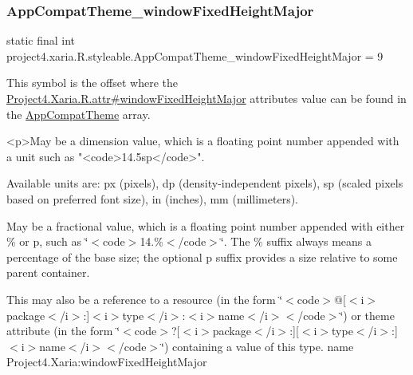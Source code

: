 \subsubsection{\texorpdfstring{App\+Compat\+Theme\+\_\+window\+Fixed\+Height\+Major}{AppCompatTheme\_windowFixedHeightMajor}}
{\footnotesize\ttfamily static final int project4.\+xaria.\+R.\+styleable.\+App\+Compat\+Theme\+\_\+window\+Fixed\+Height\+Major = 9\hspace{0.3cm}{\ttfamily [static]}}

This symbol is the offset where the \hyperlink{}{Project4.\+Xaria.\+R.\+attr\#window\+Fixed\+Height\+Major} attribute\textquotesingle{}s value can be found in the \hyperlink{classproject4_1_1xaria_1_1R_1_1styleable_aad8bec413e2350f9404e6ff0e831a85d}{App\+Compat\+Theme} array.

\begin{DoxyVerb}      <p>May be a dimension value, which is a floating point number appended with a unit such as "<code>14.5sp</code>".
\end{DoxyVerb}
 Available units are\+: px (pixels), dp (density-\/independent pixels), sp (scaled pixels based on preferred font size), in (inches), mm (millimeters). 

May be a fractional value, which is a floating point number appended with either \% or p, such as \char`\"{}$<$code$>$14.\%$<$/code$>$\char`\"{}. The \% suffix always means a percentage of the base size; the optional p suffix provides a size relative to some parent container. 

This may also be a reference to a resource (in the form \char`\"{}$<$code$>$@\mbox{[}$<$i$>$package$<$/i$>$\+:\mbox{]}$<$i$>$type$<$/i$>$\+:$<$i$>$name$<$/i$>$$<$/code$>$\char`\"{}) or theme attribute (in the form \char`\"{}$<$code$>$?\mbox{[}$<$i$>$package$<$/i$>$\+:\mbox{]}\mbox{[}$<$i$>$type$<$/i$>$\+:\mbox{]}$<$i$>$name$<$/i$>$$<$/code$>$\char`\"{}) containing a value of this type.  name Project4.\+Xaria\+:window\+Fixed\+Height\+Major \mbox{\label{classproject4_1_1xaria_1_1R_1_1styleable_a9110b2aa58050cacc46ad38d156924e2}} 
